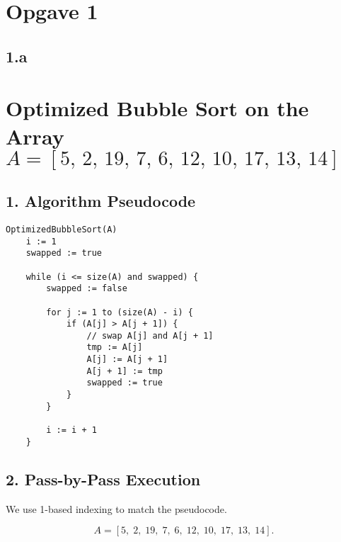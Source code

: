 \documentclass{article}
\theoremstyle{remark}
\begin{document}
\section{Opgave 1}

\subsection{1.a}


\section*{Optimized Bubble Sort on the Array \(\displaystyle A = [5,\,2,\,19,\,7,\,6,\,12,\,10,\,17,\,13,\,14]\)}

\subsection*{1. Algorithm Pseudocode}
\begin{verbatim}
OptimizedBubbleSort(A)
    i := 1
    swapped := true
    
    while (i <= size(A) and swapped) {
        swapped := false
        
        for j := 1 to (size(A) - i) {
            if (A[j] > A[j + 1]) {
                // swap A[j] and A[j + 1]
                tmp := A[j]
                A[j] := A[j + 1]
                A[j + 1] := tmp
                swapped := true
            }
        }
        
        i := i + 1
    }
\end{verbatim}

\subsection*{2. Pass-by-Pass Execution}

We use 1-based indexing to match the pseudocode.

\[
A = [5,\;2,\;19,\;7,\;6,\;12,\;10,\;17,\;13,\;14].
\]
\end{document}
